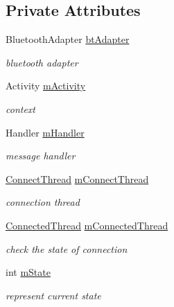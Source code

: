 \subsection*{Private Attributes}
\begin{DoxyCompactItemize}
\item 
Bluetooth\+Adapter \mbox{\hyperlink{classhi_1_1world_1_1hello_1_1myapplication_1_1_bluetooth_service_ad9ce2f2c502e4639b7bf29372c4854e6}{bt\+Adapter}}
\begin{DoxyCompactList}\small\item\em bluetooth adapter \end{DoxyCompactList}\item 
Activity \mbox{\hyperlink{classhi_1_1world_1_1hello_1_1myapplication_1_1_bluetooth_service_a6e2980acba2211ff57f127023d6bc25c}{m\+Activity}}
\begin{DoxyCompactList}\small\item\em context \end{DoxyCompactList}\item 
Handler \mbox{\hyperlink{classhi_1_1world_1_1hello_1_1myapplication_1_1_bluetooth_service_af4425f6d4f4dce5f74d5d0b39c768f89}{m\+Handler}}
\begin{DoxyCompactList}\small\item\em message handler \end{DoxyCompactList}\item 
\mbox{\hyperlink{classhi_1_1world_1_1hello_1_1myapplication_1_1_bluetooth_service_1_1_connect_thread}{Connect\+Thread}} \mbox{\hyperlink{classhi_1_1world_1_1hello_1_1myapplication_1_1_bluetooth_service_aef012419760d62f7b8ebaa98229e1e4f}{m\+Connect\+Thread}}
\begin{DoxyCompactList}\small\item\em connection thread \end{DoxyCompactList}\item 
\mbox{\hyperlink{classhi_1_1world_1_1hello_1_1myapplication_1_1_bluetooth_service_1_1_connected_thread}{Connected\+Thread}} \mbox{\hyperlink{classhi_1_1world_1_1hello_1_1myapplication_1_1_bluetooth_service_ae51e1b92ba8187d51c1fd20010839f80}{m\+Connected\+Thread}}
\begin{DoxyCompactList}\small\item\em check the state of connection \end{DoxyCompactList}\item 
int \mbox{\hyperlink{classhi_1_1world_1_1hello_1_1myapplication_1_1_bluetooth_service_aa69783785a4561195907af61f6c8dea8}{m\+State}}
\begin{DoxyCompactList}\small\item\em represent current state \end{DoxyCompactList}\end{DoxyCompactItemize}
